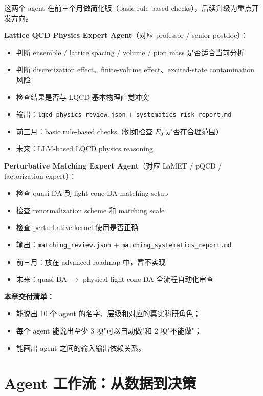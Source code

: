 \documentclass[11pt,a4paper,fontset=fandol]{ctexart}
\begin{document}
\begin{tcolorbox}[colback=gray!5,colframe=gray!50,title=定位]
这两个 agent 在前三个月做简化版（basic rule-based checks），后续升级为重点开发方向。
\end{tcolorbox}

\textbf{Lattice QCD Physics Expert Agent}（对应 professor / senior postdoc）：
\begin{itemize}
  \item 判断 ensemble / lattice spacing / volume / pion mass 是否适合当前分析
  \item 判断 discretization effect、finite-volume effect、excited-state contamination 风险
  \item 检查结果是否与 LQCD 基本物理直觉冲突
  \item 输出：\texttt{lqcd\_physics\_review.json} + \texttt{systematics\_risk\_report.md}
  \item 前三月：basic rule-based checks（例如检查 $E_0$ 是否在合理范围）
  \item 未来：LLM-based LQCD physics reasoning
\end{itemize}

\textbf{Perturbative Matching Expert Agent}（对应 LaMET / pQCD / factorization expert）：
\begin{itemize}
  \item 检查 quasi-DA 到 light-cone DA matching setup
  \item 检查 renormalization scheme 和 matching scale
  \item 检查 perturbative kernel 使用是否正确
  \item 输出：\texttt{matching\_review.json} + \texttt{matching\_systematics\_report.md}
  \item 前三月：放在 advanced roadmap 中，暂不实现
  \item 未来：quasi-DA $\to$ physical light-cone DA 全流程自动化审查
\end{itemize}

\textbf{本章交付清单：}
\begin{itemize}
  \item 能说出 10 个 agent 的名字、层级和对应的真实科研角色；
  \item 每个 agent 能说出至少 3 项"可以自动做"和 2 项"不能做"；
  \item 能画出 agent 之间的输入输出依赖关系。
\end{itemize}

\newpage

\section{Agent 工作流：从数据到决策}
\end{document}

